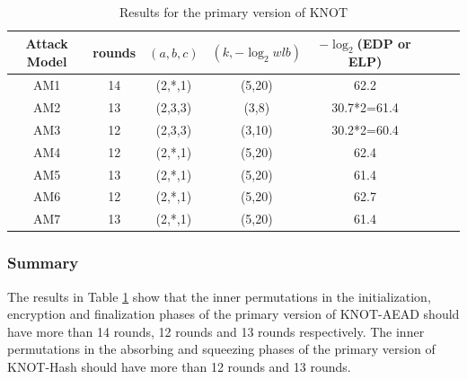 \begin{table}
	\caption{Results for the primary version of KNOT}\label{tab:knot}
	\centering
	\begin{tabular}{|c|c|c|c|c|c|c|c|}
		\hline
		Attack Model & rounds & $(a,b,c)$ & $(k,-\log_2wlb)$ & $-\log_2$(EDP or ELP)\\
		\hline
		AM1 & 14 & (2,*,1) & (5,20) & 62.2 \\
		AM2 & 13 & (2,3,3) & (3,8) & 30.7*2=61.4 \\
		AM3 & 12 & (2,3,3) & (3,10) & 30.2*2=60.4 \\
		AM4 & 12 & (2,*,1) & (5,20) & 62.4 \\
		AM5 & 13 & (2,*,1) & (5,20) & 61.4 \\
		AM6 & 12 & (2,*,1) & (5,20) & 62.7 \\
		AM7 & 13 & (2,*,1) & (5,20) & 61.4 \\
		\hline
	\end{tabular}
\end{table}

\subsubsection{Summary}

The results in Table \ref{tab:knot} show that the inner permutations in the initialization, encryption and finalization phases of the primary version of KNOT-AEAD should have more than 14 rounds, 12 rounds and 13 rounds respectively. The inner permutations in the absorbing and squeezing phases of the primary version of KNOT-Hash should have more than 12 rounds and 13 rounds. 


